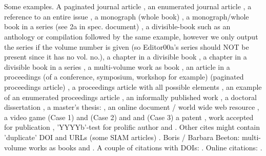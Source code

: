 \documentclass[sigplan,screen,anonymous]{acmart}
\begin{document}


\newpage
\section{}
Some examples.  A paginated journal article \cite{Abril07}, an enumerated journal article \cite{Cohen07}, a reference to an entire issue \cite{JCohen96}, a monograph (whole book) \cite{Kosiur01}, a monograph/whole book in a series (see 2a in spec. document)
\cite{Harel79}, a divisible-book such as an anthology or compilation \cite{Editor00} followed by the same example, however we only output the series if the volume number is given \cite{Editor00a} (so Editor00a's series should NOT be present since it has no vol. no.),
a chapter in a divisible book \cite{Spector90}, a chapter in a divisible book in a series \cite{Douglass98}, a multi-volume work as book \cite{Knuth97}, an article in a proceedings (of a conference, symposium, workshop for example) (paginated proceedings article) \cite{Andler79}, a proceedings article with all possible elements \cite{Smith10}, an example of an enumerated proceedings article \cite{VanGundy07}, an informally published work \cite{Harel78}, a doctoral dissertation \cite{Clarkson85}, a master's thesis: \cite{anisi03}, an online document / world wide web resource \cite{Thornburg01, Ablamowicz07, Poker06}, a video game (Case 1) \cite{Obama08} and (Case 2) \cite{Novak03} and \cite{Lee05} and (Case 3) a patent \cite{JoeScientist001}, work accepted for publication \cite{rous08}, 'YYYYb'-test for prolific author \cite{SaeediMEJ10} and \cite{SaeediJETC10}. Other cites might contain 'duplicate' DOI and URLs (some SIAM articles) \cite{Kirschmer:2010:AEI:1958016.1958018}. Boris / Barbara Beeton: multi-volume works as books \cite{MR781536} and \cite{MR781537}. A couple of citations with DOIs: \cite{2004:ITE:1009386.1010128,Kirschmer:2010:AEI:1958016.1958018}. Online citations: \cite{TUGInstmem, Thornburg01, CTANacmart}.

%

%



%
\end{document}
